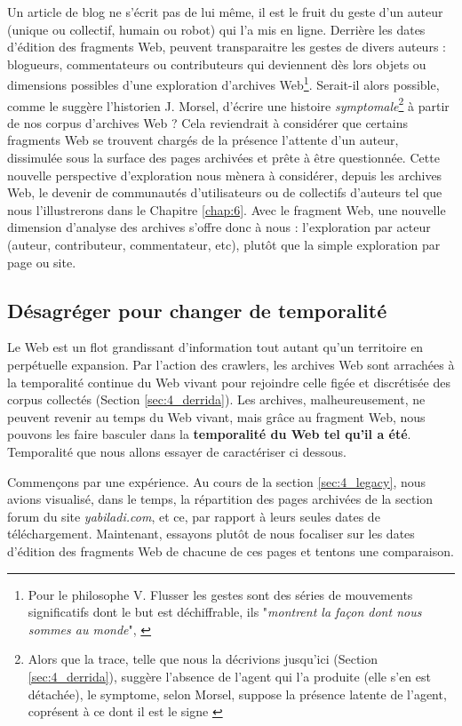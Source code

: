 \documentclass[symmetric,justified,marginals=raggedouter]{tufte-book}
\begin{document}
Un article de blog ne s'écrit pas de lui même, il est le fruit du geste d'un auteur (unique ou collectif, humain ou robot) qui l'a mis en ligne. Derrière les dates d'édition des fragments Web, peuvent transparaitre les gestes de divers auteurs : blogueurs, commentateurs ou contributeurs qui deviennent dès lors objets ou dimensions possibles d'une exploration d'archives Web\footnote{Pour le philosophe V. Flusser les gestes sont des séries de mouvements significatifs dont le but est déchiffrable, ils "\textit{montrent la façon dont nous sommes au monde}", \citep[p.319]{flusser_les_2014}}. Serait-il alors possible, comme le suggère l'historien J. Morsel, d'écrire une histoire \textit{symptomale}\footnote{Alors que la trace, telle que nous la décrivions jusqu'ici (Section \ref{sec:4_derrida}), suggère l'absence de l'agent qui l'a produite (elle s'en est détachée), le symptome, selon Morsel, suppose la présence latente de l'agent, coprésent à ce dont il est le signe \citep{morsel_traces?_2016}} \citep{morsel_traces?_2016} à partir de nos corpus d'archives Web ? Cela reviendrait à considérer que certains fragments Web se trouvent chargés de la présence l'attente d'un auteur, dissimulée sous la surface des pages archivées et prête à être questionnée. Cette nouvelle perspective d'exploration nous mènera à considérer, depuis les archives Web, le devenir de communautés d'utilisateurs ou de collectifs d'auteurs tel que nous l'illustrerons dans le Chapitre \ref{chap:6}. Avec le fragment Web, une nouvelle dimension d'analyse des archives s'offre donc à nous : l'exploration par acteur (auteur, contributeur, commentateur, etc), plutôt que la simple exploration par page ou site.

\subsection{Désagréger pour changer de temporalité}

\noindent Le Web est un flot grandissant d'information tout autant qu'un territoire en perpétuelle expansion. Par l'action des crawlers, les archives Web sont arrachées à la temporalité continue du Web vivant pour rejoindre celle figée et discrétisée des corpus collectés (Section \ref{sec:4_derrida}). Les archives, malheureusement, ne peuvent revenir au temps du Web vivant, mais grâce au fragment Web, nous pouvons les faire basculer dans la \textbf{temporalité du Web tel qu'il a été}. Temporalité que nous allons essayer de caractériser ci dessous.  

Commençons par une expérience. Au cours de la section \ref{sec:4_legacy}, nous avions visualisé, dans le temps, la répartition des pages archivées de la section forum du site \textit{yabiladi.com}, et ce, par rapport à leurs seules dates de téléchargement. Maintenant, essayons plutôt de nous focaliser sur les dates d'édition des fragments Web de chacune de ces pages et tentons une comparaison. 
\end{document}
